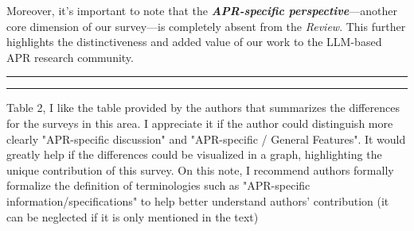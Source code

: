 \documentclass[acmsmall]{acmart}
\begin{document}
	Moreover, it's important to note that the \textbf{\textit{APR-specific perspective}}---another core
	dimension of our survey---is completely absent from the \textit{Review}. This further highlights
	the distinctiveness and added value of our work to the LLM-based APR research community.

	\vspace{1em}
	\hrule \hrule

	\begin{tcolorbox}
		[commentbox,title=Reviewer \#2 - Comment 4] Table 2, I like the table provided by the authors
		that summarizes the differences for the surveys in this area. I appreciate it if the author
		could distinguish more clearly "APR-specific discussion" and "APR-specific / General Features".
		It would greatly help if the differences could be visualized in a graph, highlighting the
		unique contribution of this survey. On this note, I recommend authors formally formalize the
		definition of terminologies such as "APR-specific information/specifications" to help better
		understand authors' contribution (it can be neglected if it is only mentioned in the text)
	\end{tcolorbox}





\end{document}
